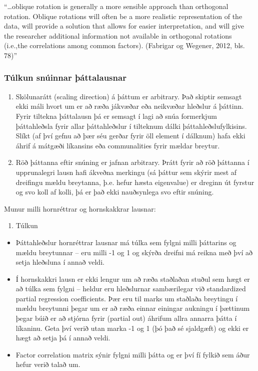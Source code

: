\documentclass[]{book}
\providecommand{\tightlist}{%
  \setlength{\itemsep}{0pt}\setlength{\parskip}{0pt}}
\begin{document}
``\ldots{}oblique rotation is generally a more sensible approach than orthogonal rotation. Oblique rotations will often be a more realistic representation of the data, will provide a solution that allows for easier interpretation, and will give the researcher additional information not available in orthogonal rotations (i.e.,the correlations among common factors). (Fabrigar og Wegener, 2012, bls. 78)''

\hypertarget{tuxfalkun-snuxfainnar-uxfeuxe1ttalausnar}{%
\subsubsection{Túlkun snúinnar þáttalausnar}\label{tuxfalkun-snuxfainnar-uxfeuxe1ttalausnar}}

\begin{enumerate}
\def\labelenumi{\arabic{enumi})}
\item
  Skölunarátt (scaling direction) á þáttum er arbitrary. Það skiptir semsagt ekki máli hvort um er að ræða jákvæðar eða neikvæðar hleðslur á þáttinn. Fyrir tiltekna þáttalausn þá er semsagt í lagi að snúa formerkjum þáttahleðsla fyrir allar þáttahleðslur í tilteknum dálki þáttahleðslufylkisins. Slíkt (af því gefnu að þær séu gerðar fyrir öll element í dálknum) hafa ekki áhrif á mátgæði líkansins eða communalities fyrir mældar breytur.
\item
  Röð þáttanna eftir snúning er jafnan arbitrary. Þrátt fyrir að röð þáttanna í upprunalegri lausn hafi ákveðna merkingu (sá þáttur sem skýrir mest af dreifingu mældu breytanna, þ.e. hefur hæsta eigenvalue) er dreginn út fyrstur og svo koll af kolli, þá er það ekki nauðsynlega svo eftir snúning.
\end{enumerate}

Munur milli hornréttrar og hornskakkrar lausnar:

\begin{enumerate}
\def\labelenumi{\arabic{enumi})}
\tightlist
\item
  Túlkun
\end{enumerate}

\begin{itemize}
\tightlist
\item
  Þáttahleðslur hornréttrar lausnar má túlka sem fylgni milli þáttarins og mældu breytunnar -- eru milli -1 og 1 og skýrða dreifni má reikna með því að setja hleðsluna í annað veldi.
\item
  Í hornskakkri lausn er ekki lengur um að ræða staðlaðan stuðul sem hægt er að túlka sem fylgni -- heldur eru hleðslurnar sambærilegar við standardized partial regression coefficients. Þær eru til marks um staðlaða breytingu í mældu breytunni þegar um er að ræða einnar einingar aukningu í þættinum þegar búið er að stjórna fyrir (partial out) áhrifum allra annarra þátta í líkaninu. Geta því verið utan marka -1 og 1 (þó það sé sjaldgæft) og ekki er hægt að setja þá í annað veldi.
\item
  Factor correlation matrix sýnir fylgni milli þátta og er því fí fylkið sem áður hefur verið talað um.
\end{itemize}
\end{document}
